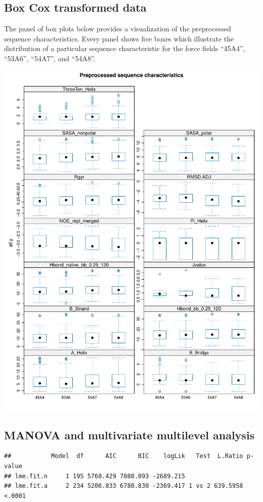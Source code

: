 \documentclass{article}\usepackage[table]{xcolor}
\makeatletter
\def\maxwidth{ %
  \ifdim\Gin@nat@width>\linewidth
    \linewidth
  \else
    \Gin@nat@width
  \fi
}
\newenvironment{kframe}{%
 \def\at@end@of@kframe{}%
 \ifinner\ifhmode%
  \def\at@end@of@kframe{\end{minipage}}%
  \begin{minipage}{\columnwidth}%
 \fi\fi%
 \def\FrameCommand##1{\hskip\@totalleftmargin \hskip-\fboxsep
 \colorbox{shadecolor}{##1}\hskip-\fboxsep
     \hskip-\linewidth \hskip-\@totalleftmargin \hskip\columnwidth}%
 \MakeFramed {\advance\hsize-\width
   \@totalleftmargin\z@ \linewidth\hsize
   \@setminipage}}%
 {\par\unskip\endMakeFramed%
 \at@end@of@kframe}
\newenvironment{knitrout}{}{} %
\renewcommand{\$}{$} %
\makeatother
\begin{document}
\subsection{Box Cox transformed data}
The panel of box plots below provides a visualization of the
preprocessed sequence characteristics.  Every panel shows five boxes
which illustrate the distribution of a particular sequence
characteristic for the force fields ``45A4'', ``53A6'', ``54A7'', and
``54A8''.

\begin{knitrout}
\color{fgcolor}
\includegraphics[width=\maxwidth]{figure/bp-chunk-1} 
\end{knitrout}

\subsection{MANOVA and multivariate multilevel analysis}
\begin{knitrout}
\color{fgcolor}\begin{kframe}
\begin{verbatim}
##           Model  df      AIC      BIC    logLik   Test  L.Ratio p-value
## lme.fit.n     1 195 5768.429 7080.093 -2689.215                        
## lme.fit.a     2 234 5206.833 6780.830 -2369.417 1 vs 2 639.5958  <.0001
\end{verbatim}
\end{kframe}
\end{knitrout}
\end{document}
